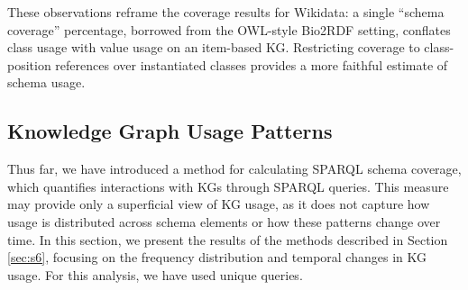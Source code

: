 \documentclass[sw]{iosart2x}
\begin{document}
These observations reframe the coverage results for Wikidata: a single ``schema coverage'' percentage, borrowed from the OWL-style Bio2RDF setting, conflates class usage with value usage on an item-based KG. Restricting coverage to class-position references over instantiated classes provides a more faithful estimate of schema usage.


\subsection{Knowledge Graph Usage Patterns }
Thus far, we have introduced a method for calculating SPARQL schema coverage, which quantifies interactions with KGs through SPARQL queries. This measure may provide only a superficial view of KG usage, as it does not capture how usage is distributed across schema elements or how these patterns change over time. In this section, we present the results of the methods described in Section \ref{sec:s6}, focusing on the frequency distribution and temporal changes in KG usage. For this analysis, we have used unique queries.
\end{document}
